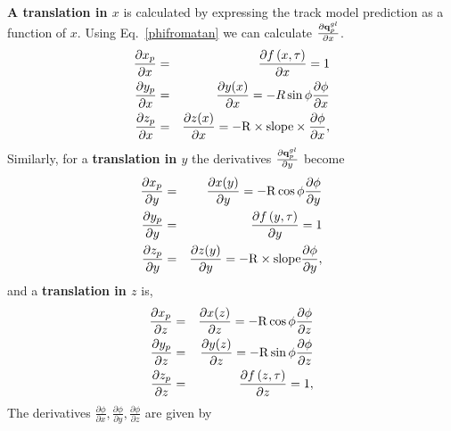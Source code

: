 \documentclass{article}
\def\R{\ensuremath{\mathrm{R}}}
\def\slope{\ensuremath{\mathrm{slope}}}
\def\vec#1{\ensuremath{\mathrm{\bf #1}}}
\def\partder#1#2{\ensuremath{\frac{\partial #1}{\partial #2}}}
\begin{document}
{\bf A translation in $x$} is calculated by expressing the track model prediction as a function of $x$.
Using Eq.~\ref{phifromatan} we can calculate $\partder{\vec{q}_p^{gl}}{x}$.
\begin{eqnarray}
\partder{x_p}{x} &=& \partder{f\left(x,\vec{\tau}\right)}{x} = 1 \nonumber\\
\partder{y_p}{x} &=& \partder{y(x)} {x} = -R\sin\phi \partder{\phi}{x} \nonumber \\
\partder{z_p}{x} &=& \partder{z(x)} {x} = -\R\times\slope\times\partder{\phi}{x}, \nonumber
\end{eqnarray}
Similarly, for a {\bf translation in $y$} the derivatives $\partder{\vec{q}_p^{gl}}{y}$ become 
\begin{eqnarray}
\partder{x_p}{y} &=& \partder{x(y)}{y} = -\R\cos\phi \partder{\phi}{y} \nonumber \\
\partder{y_p}{y} &=& \partder{f\left(y,\vec{\tau}\right)}{y} = 1 \nonumber\\
\partder{z_p}{y} &=& \partder{z(y)}{y} = -\R\times\slope\partder{\phi}{y}, \nonumber \\
\end{eqnarray}
and a {\bf translation in $z$} is,
\begin{eqnarray}
\partder{x_p}{z} &=& \partder{x(z)}{z}  = -\R\cos\phi \partder{\phi}{z} \nonumber \\
\partder{y_p}{z} &=& \partder{y(z)}{z}  = -\R\sin\phi\partder{\phi}{z} \nonumber \\
\partder{z_p}{z} &=& \partder{f\left(z,\vec{\tau}\right)}{z}  = 1, \nonumber\\
\end{eqnarray}
The derivatives $\partder{\phi}{x},\partder{\phi}{y},\partder{\phi}{z}$ are given by
\end{document}
